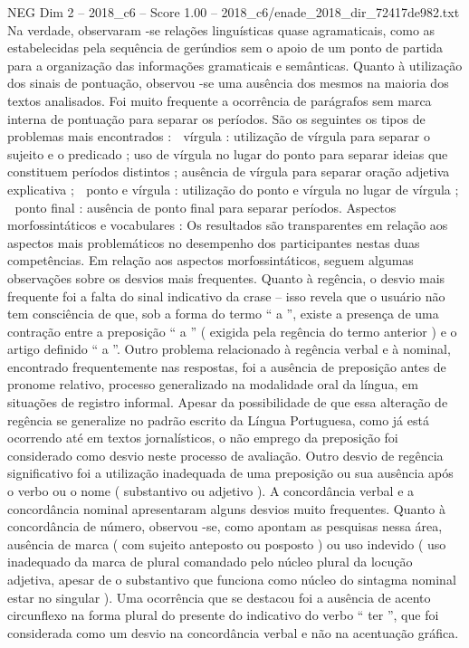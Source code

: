 \begin{textsample}{NEG Dim 2 – 2018\_c6 – Score 1.00 – 2018\_c6/enade\_2018\_dir\_72417de982.txt}
Na verdade, observaram -se relações linguísticas quase agramaticais, como as estabelecidas pela sequência de gerúndios sem o apoio de um ponto de partida para a organização das informações gramaticais e semânticas.
Quanto à utilização dos sinais de pontuação, observou -se uma ausência dos mesmos na maioria dos textos analisados.
Foi muito frequente a ocorrência de parágrafos sem marca interna de pontuação para separar os períodos.
São os seguintes os tipos de problemas mais encontrados :  vírgula : utilização de vírgula para separar o sujeito e o predicado ; uso de vírgula no lugar do ponto para separar ideias que constituem períodos distintos ; ausência de vírgula para separar oração adjetiva explicativa ;  ponto e vírgula : utilização do ponto e vírgula no lugar de vírgula ;  ponto final : ausência de ponto final para separar períodos.
Aspectos morfossintáticos e vocabulares : Os resultados são transparentes em relação aos aspectos mais problemáticos no desempenho dos participantes nestas duas competências.
Em relação aos aspectos morfossintáticos, seguem algumas observações sobre os desvios mais frequentes.
Quanto à regência, o desvio mais frequente foi a falta do sinal indicativo da crase – isso revela que o usuário não tem consciência de que, sob a forma do termo “ a ”, existe a presença de uma contração entre a preposição “ a ” ( exigida pela regência do termo anterior ) e o artigo definido “ a ”.
Outro problema relacionado à regência verbal e à nominal, encontrado frequentemente nas respostas, foi a ausência de preposição antes de pronome relativo, processo generalizado na modalidade oral da língua, em situações de registro informal.
Apesar da possibilidade de que essa alteração de regência se generalize no padrão escrito da Língua Portuguesa, como já está ocorrendo até em textos jornalísticos, o não emprego da preposição foi considerado como desvio neste processo de avaliação.
Outro desvio de regência significativo foi a utilização inadequada de uma preposição ou sua ausência após o verbo ou o nome ( substantivo ou adjetivo ).
A concordância verbal e a concordância nominal apresentaram alguns desvios muito frequentes.
Quanto à concordância de número, observou -se, como apontam as pesquisas nessa área, ausência de marca ( com sujeito anteposto ou posposto ) ou uso indevido ( uso inadequado da marca de plural comandado pelo núcleo plural da locução adjetiva, apesar de o substantivo que funciona como núcleo do sintagma nominal estar no singular ).
Uma ocorrência que se destacou foi a ausência de acento circunflexo na forma plural do presente do indicativo do verbo “ ter ”, que foi considerada como um desvio na concordância verbal e não na acentuação gráfica.

\end{textsample}
